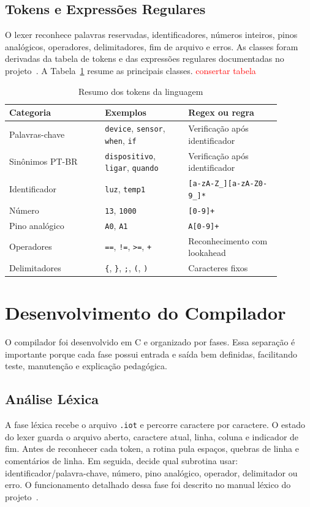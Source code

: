 \documentclass[conference]{IEEEtran}
\begin{document}
\subsection{Tokens e Expressões Regulares}
O lexer reconhece palavras reservadas, identificadores, números inteiros, pinos analógicos, operadores, delimitadores, fim de arquivo e erros. As classes foram derivadas da tabela de tokens e das expressões regulares documentadas no projeto~\cite{docs-tokens}. A Tabela~\ref{tab:tokens} resume as principais classes.
\textcolor{red}{consertar tabela}
\begin{table}[htbp]
\caption{Resumo dos tokens da linguagem}
\label{tab:tokens}
\centering
\begin{tabular}{p{0.31\linewidth}p{0.27\linewidth}p{0.3\linewidth}}
\toprule
\textbf{Categoria} & \textbf{Exemplos} & \textbf{Regex ou regra} \\
\midrule
Palavras-chave & \texttt{device}, \texttt{sensor}, \texttt{when}, \texttt{if} & Verificação após identificador \\
Sinônimos PT-BR & \texttt{dispositivo}, \texttt{ligar}, \texttt{quando} & Verificação após identificador \\
Identificador & \texttt{luz}, \texttt{temp1} & \texttt{[a-zA-Z\_][a-zA-Z0-9\_]*} \\
Número & \texttt{13}, \texttt{1000} & \texttt{[0-9]+} \\
Pino analógico & \texttt{A0}, \texttt{A1} & \texttt{A[0-9]+} \\
Operadores & \texttt{==}, \texttt{!=}, \texttt{>=}, \texttt{+} & Reconhecimento com lookahead \\
Delimitadores & \texttt{\{}, \texttt{\}}, \texttt{;}, \texttt{(}, \texttt{)} & Caracteres fixos \\
\bottomrule
\end{tabular}
\end{table}

\section{Desenvolvimento do Compilador}
O compilador foi desenvolvido em C e organizado por fases. Essa separação é importante porque cada fase possui entrada e saída bem definidas, facilitando teste, manutenção e explicação pedagógica.

\subsection{Análise Léxica}
A fase léxica recebe o arquivo \texttt{.iot} e percorre caractere por caractere. O estado do lexer guarda o arquivo aberto, caractere atual, linha, coluna e indicador de fim. Antes de reconhecer cada token, a rotina pula espaços, quebras de linha e comentários de linha. Em seguida, decide qual subrotina usar: identificador/palavra-chave, número, pino analógico, operador, delimitador ou erro. O funcionamento detalhado dessa fase foi descrito no manual léxico do projeto~\cite{docs-lex}.
\end{document}
